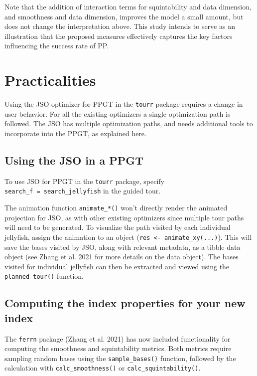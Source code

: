\documentclass[
  12pt,
]{interact}
\theoremstyle{plain}
\begin{document}
Note that the addition of interaction terms for squintability and data
dimension, and smoothness and data dimension, improves the model a small
amount, but does not change the interpretation above. This study intends
to serve as an illustration that the proposed measures effectively
captures the key factors influencing the success rate of PP.

\section{Practicalities}\label{sec-discussion}

Using the JSO optimizer for PPGT in the \texttt{tourr} package requires
a change in user behavior. For all the existing optimizers a single
optimization path is followed. The JSO has multiple optimization paths,
and needs additional tools to incorporate into the PPGT, as explained
here.

\subsection{Using the JSO in a PPGT}\label{using-the-jso-in-a-ppgt}

To use JSO for PPGT in the \texttt{tourr} package, specify
\texttt{search\_f\ =\ search\_jellyfish} in the guided tour.

The animation function \texttt{animate\_*()} won't directly render the
animated projection for JSO, as with other existing optimizers since
multiple tour paths will need to be generated. To visualize the path
visited by each individual jellyfish, assign the animation to an object
(\texttt{res\ \textless{}-\ animate\_xy(...)}). This will save the bases
visited by JSO, along with relevant metadata, as a tibble data object
(see Zhang et al. 2021 for more details on the data object). The bases
visited for individual jellyfish can then be extracted and viewed using
the \texttt{planned\_tour()} function.

\subsection{Computing the index properties for your new
index}\label{computing-the-index-properties-for-your-new-index}

The \texttt{ferrn} package (Zhang et al. 2021) has now included
functionality for computing the smoothness and squintability metrics.
Both metrics require sampling random bases using the
\texttt{sample\_bases()} function, followed by the calculation with
\texttt{calc\_smoothness()} or \texttt{calc\_squintability()}.
\end{document}
